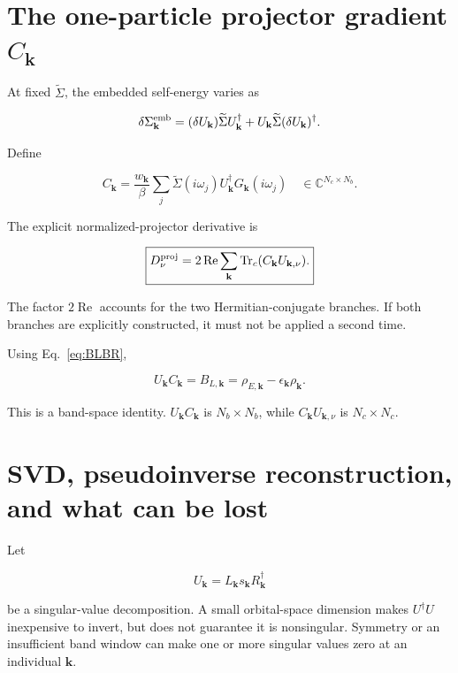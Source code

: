 \documentclass[11pt]{article}
\numberwithin{equation}{section}
\newcommand{\Tr}{\operatorname{Tr}}
\newcommand{\Ree}{\operatorname{Re}}
\newcommand{\kb}{\mathbf k}
\newcommand{\Sig}{\widetilde\Sigma}
\begin{document}
\section{The one-particle projector gradient $C_{\kb}$}
\label{sec:C}

At fixed $\Sig$, the embedded self-energy varies as

\begin{equation}
 \delta\Sigma_{\kb}^{\rm emb}
 =(\delta U_{\kb})\Sig U_{\kb}^\dagger
 +U_{\kb}\Sig(\delta U_{\kb})^\dagger.
\end{equation}

Define

\begin{equation}
 \boxed{
 C_{\kb}=\frac{w_{\kb}}{\beta}
 \sum_j\Sig(i\omega_j)U_{\kb}^\dagger G_{\kb}(i\omega_j)
 }
 \quad\in\mathbb C^{N_c\times N_b}.
 \label{eq:Cdirect}
\end{equation}

The explicit normalized-projector derivative is

\begin{equation}
 \boxed{
 D_\nu^{\rm proj}
 =2\Ree\sum_{\kb}\Tr_c(C_{\kb}U_{\kb,\nu}).
 }
 \label{eq:projectorstress}
\end{equation}

The factor $2\Ree$ accounts for the two Hermitian-conjugate branches.  If both
branches are explicitly constructed, it must not be applied a second time.

Using Eq.~\eqref{eq:BLBR},

\begin{equation}
 \boxed{U_{\kb}C_{\kb}=B_{L,\kb}
 =\rho_{E,\kb}-\epsilon_{\kb}\rho_{\kb}.}
 \label{eq:UC}
\end{equation}

This is a band-space identity.  $U_{\kb}C_{\kb}$ is
$N_b\times N_b$, while $C_{\kb}U_{\kb,\nu}$ is $N_c\times N_c$.

\section{SVD, pseudoinverse reconstruction, and what can be lost}

Let

\begin{equation}
 U_{\kb}=L_{\kb}s_{\kb}R_{\kb}^\dagger
\end{equation}

be a singular-value decomposition.  A small orbital-space dimension makes
$U^\dagger U$ inexpensive to invert, but does not guarantee it is nonsingular.
Symmetry or an insufficient band window can make one or more singular values
zero at an individual $\kb$.
\end{document}
